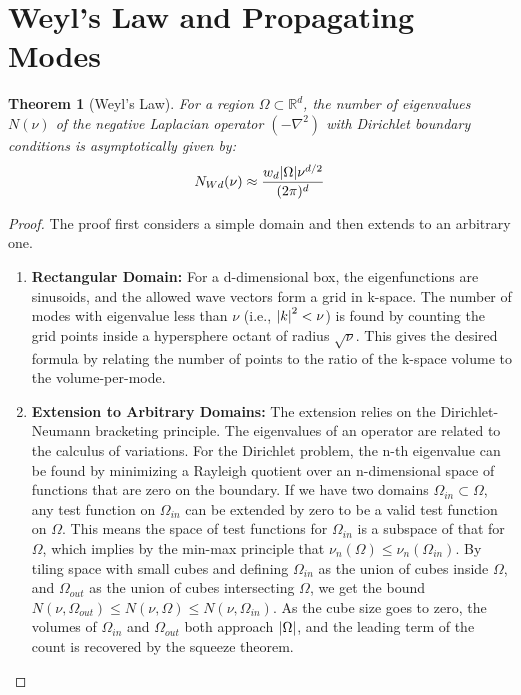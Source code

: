 \documentclass[11pt,a4paper]{article}
\newtheorem{theorem}{Theorem}[section]
\begin{document}
\section{Weyl's Law and Propagating Modes}

\begin{theorem}[Weyl's Law]
For a region \(\Omega\subset\mathbb{R}^{d}\), the number of eigenvalues \(N(\nu)\) of the negative Laplacian operator \((-\nabla^{2})\) with Dirichlet boundary conditions is asymptotically given by:
\begin{equation}
    N_{Wd}(\nu)\approx\frac{w_{d}\abs{\Omega}\nu^{d/2}}{(2\pi)^{d}}
\end{equation}
\end{theorem}

\begin{proof}
The proof first considers a simple domain and then extends to an arbitrary one.
\begin{enumerate}
    \item \textbf{Rectangular Domain:} For a d-dimensional box, the eigenfunctions are sinusoids, and the allowed wave vectors form a grid in k-space. The number of modes with eigenvalue less than \(\nu\) (i.e., \(\abs{k}^{2}<\nu\)) is found by counting the grid points inside a hypersphere octant of radius \(\sqrt{\nu}\). This gives the desired formula by relating the number of points to the ratio of the k-space volume to the volume-per-mode.
    
    \item \textbf{Extension to Arbitrary Domains:} The extension relies on the Dirichlet-Neumann bracketing principle. The eigenvalues of an operator are related to the calculus of variations. For the Dirichlet problem, the n-th eigenvalue can be found by minimizing a Rayleigh quotient over an n-dimensional space of functions that are zero on the boundary. If we have two domains \(\Omega_{in}\subset\Omega\), any test function on \(\Omega_{in}\) can be extended by zero to be a valid test function on \(\Omega\). This means the space of test functions for \(\Omega_{in}\) is a subspace of that for \(\Omega\), which implies by the min-max principle that \(\nu_{n}(\Omega)\le\nu_{n}(\Omega_{in})\). By tiling space with small cubes and defining \(\Omega_{in}\) as the union of cubes inside \(\Omega\), and \(\Omega_{out}\) as the union of cubes intersecting \(\Omega\), we get the bound \(N(\nu,\Omega_{out})\le N(\nu,\Omega)\le N(\nu,\Omega_{in})\). As the cube size goes to zero, the volumes of \(\Omega_{in}\) and \(\Omega_{out}\) both approach \(\abs{\Omega}\), and the leading term of the count is recovered by the squeeze theorem.
\end{enumerate}
\end{proof}
\end{document}
